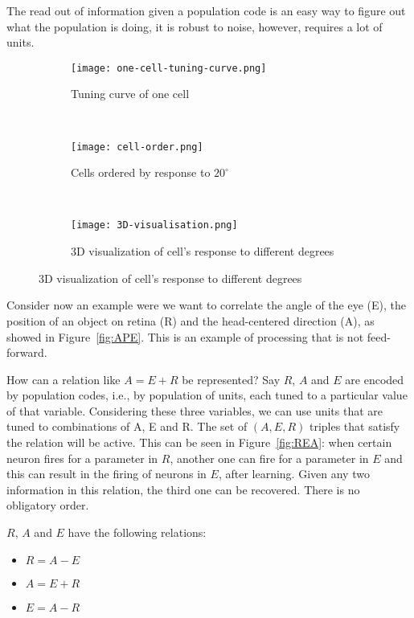 \documentclass[main]{subfiles}
\begin{document}
The read out of information given a population code is an easy way to figure out what the population is doing, it is robust to noise, however, requires a lot of units.

\begin{figure}[H]
	\centering
	\begin{subfigure}[b]{0.3\textwidth}
		\centering
		\texttt{[image: one-cell-tuning-curve.png]}
		\caption{Tuning curve of one cell}
		\label{fig:tuning-curve}
	\end{subfigure}%
	~
	\begin{subfigure}[b]{0.3\textwidth}
		\centering
		\texttt{[image: cell-order.png]}
		\caption{Cells ordered by response to $20^\circ$}
		\label{fig:cell-order}
	\end{subfigure}
	~ 
	\begin{subfigure}[b]{0.3\textwidth}
		\centering
		\texttt{[image: 3D-visualisation.png]}
		\caption{3D visualization of cell's response to different degrees}
		\label{fig:3d}
	\end{subfigure}
\end{figure}

Consider now an example were we want to correlate the angle of the eye (E), the position of an object on retina (R) and the head-centered direction (A), as showed in Figure~\ref{fig:APE}.
This is an example of processing that is not feed-forward.

How can a relation like $A = E + R$ be represented?
Say $R$, $A$ and $E$ are encoded by population codes, i.e., by population of units, each tuned to a particular value of that variable. Considering these three variables, we can use units that are tuned to combinations of A, E and R.
The set of $(A, E, R)$ triples that satisfy the relation will be active.
This can be seen in Figure~\ref{fig:REA}: when certain neuron fires for a parameter in $R$, another one can fire for a parameter in $E$ and this can result in the firing of neurons in $E$, after learning.
Given any two information in this relation, the third one can be recovered. There is no obligatory order.

$R$, $A$ and $E$ have the following relations:
\begin{itemize}
\item $R = A - E$
\item $A = E + R$
\item $E = A - R$
\end{itemize}
\end{document}

